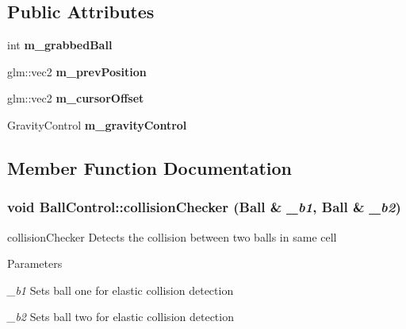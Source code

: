 \subsection*{Public Attributes}
\begin{DoxyCompactItemize}
\item 
\hypertarget{classBallControl_ac64a1d833bcd49fa9ab2ebcce3995be6}{
int {\bfseries m\_\-grabbedBall}}
\label{classBallControl_ac64a1d833bcd49fa9ab2ebcce3995be6}

\item 
\hypertarget{classBallControl_a49b276d3d47c744915e289985b54ae4e}{
glm::vec2 {\bfseries m\_\-prevPosition}}
\label{classBallControl_a49b276d3d47c744915e289985b54ae4e}

\item 
\hypertarget{classBallControl_abe4695134fe9cfabef70ed8620de37d2}{
glm::vec2 {\bfseries m\_\-cursorOffset}}
\label{classBallControl_abe4695134fe9cfabef70ed8620de37d2}

\item 
\hypertarget{classBallControl_a64337536a5959b08a7f0b5cb9af52691}{
GravityControl {\bfseries m\_\-gravityControl}}
\label{classBallControl_a64337536a5959b08a7f0b5cb9af52691}

\end{DoxyCompactItemize}


\subsection{Member Function Documentation}
\hypertarget{classBallControl_a062a70454845cbf25fe7f15554676ab9}{
\subsubsection[{collisionChecker}]{\setlength{\rightskip}{0pt plus 5cm}void BallControl::collisionChecker ({\bf Ball} \& {\em \_\-b1}, \/  {\bf Ball} \& {\em \_\-b2})}}
\label{classBallControl_a062a70454845cbf25fe7f15554676ab9}


collisionChecker Detects the collision between two balls in same cell 
\begin{DoxyParams}{Parameters}
\item[{\em \_\-b1}]Sets ball one for elastic collision detection \item[{\em \_\-b2}]Sets ball two for elastic collision detection \end{DoxyParams}



